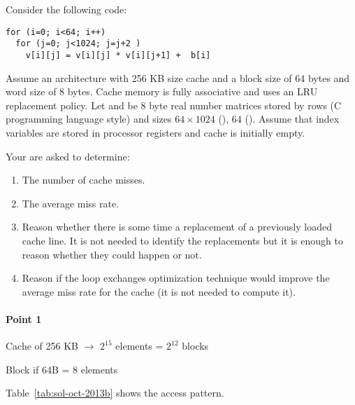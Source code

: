 \begin{acexercise}\end{acexercise}

Consider the following code:

\begin{lstlisting}
for (i=0; i<64; i++)
  for (j=0; j<1024; j=j+2 )
    v[i][j] = v[i][j] * v[i][j+1] +  b[i]
\end{lstlisting}

Assume an architecture with 256 KB size cache and a block size of 64 bytes and
word size of 8 bytes. Cache memory is fully associative and uses an LRU replacement
policy. Let  and  be 8 byte real number matrices stored by rows
(C programming language style) and sizes
 $64 \times 1024$ (), $64$ (). 
Assume that index variables are stored in processor registers and cache is initially empty.

Your are asked to determine:

\begin{enumerate}
  \item The number of cache misses.

  \item The average miss rate.

  \item Reason whether there is some time a replacement of a previously loaded cache line.
        It is not needed to identify the replacements but it is enough to reason
        whether they could happen or not.

  \item Reason if the loop exchanges optimization technique would improve the
        average miss rate for the cache (it is not needed to compute it).

\end{enumerate}


\begin{acsolution}\end{acsolution}

\paragraph{Point 1}

Cache of 256 KB $\rightarrow$ $2^{15}$ elements = $2^{12}$  blocks

Block if 64B = 8 elements

Table~\ref{tab:sol-oct-2013b} shows the access pattern.

